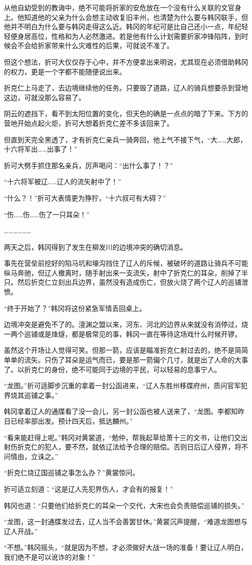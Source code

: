 从他自幼受到的教诲中，绝不可能将折家的安危放在一个没有什么关联的文官身上。他知道他的父亲为什么会想主动收复旧丰州，也清楚为什么要与韩冈联手，但他并不明白为什么要与韩冈走得这么近。韩冈的年纪可是比自己还小一点，年纪轻轻便身居高位，性格和为人必然激进。若是他有什么计划需要折家冲锋陷阵，到时候会不会给折家带来什么灾难性的后果，可就说不准了。

但这个想法，折可大仅仅存于心中，并不方便拿出来明说，尤其现在必须借助韩冈的权力，更是一个字都不能随便说出来。

折克仁上马走了，去边境继续他的任务。只要毁了道路，辽人的骑兵想要杀到营地这边，可就没那么容易了。

阴云的遮挡下，看不到太阳位置的变化，但天色的确是一点点的暗了下来。下方的营地开始点起火炬，折可大想着折克仁差不多该回来了。

但直到天完全黑透了，才有折克仁亲兵一骑奔回，他上气不接下气，“大……大郎，十六将军出……出事了！”

折可大劈手抓住那名亲兵，厉声喝问：“出什么事了！？”

“十六将军被辽……辽人的流矢射中了！”

“什么？！”折可大表情更为狰狞，“十六叔可有大碍？”

“伤……伤……伤了一只耳朵！”

………………

两天之后，韩冈得到了发生在柳发川的边境冲突的确切消息。

事先在营垒前挖好的陷马坑和壕沟挡住了辽人的斥候，被破坏的道路让骑兵不可能纵马奔驰，但辽人撤离时，随手射出来一支流矢，射中了折克仁的耳朵，削掉了半只。然后折克仁立刻出兵边界，虽然没有造成伤亡，但放火烧了两个辽人的巡铺泄愤。

“终于开始了？”韩冈将这份紧急军情丢回桌上。

边境冲突是避免不了的。澶渊之盟以来，河东、河北的边界从来就没有消停过，烧一两个巡铺或是烽燧，都是极常见的事，韩冈一直在等待这场戏什么时候开锣。

虽然这个开场让人觉得可笑。但那一箭，应该是瞄准折克仁射过去的，绝不是简简单单的流矢。只伤了耳朵是运气而已，要是那一箭偏个几寸，就是出了人命的大事了。以折克仁的身份，绝不可能同于边境的平民，可以轻易的息事宁人。

“龙图。”折可适脚步沉重的拿着一封公函进来，“辽人东胜州移牒府州，质问官军犯界烧其巡铺之事。”

韩冈拿着辽人的通牒看了没一会儿，另一封公函也被人送来了，“龙图。李都知昨日已经率部出发。预计四天后，抵达麟州。”

“看来能赶得上呢。”韩冈对黄裳道，“勉仲，帮我起草给萧十三的文书，让他们交出射伤折克仁的犯人，要不然，就依辽法给予合理的赔偿。否则日后辽人侵界，将不问情由，立诛之。”

“折克仁烧辽国巡铺之事怎么办？”黄裳惊问。

折可适立刻道：“这是辽人先犯界伤人，才会有的报复！”

韩冈也道：“只要他们给折克仁的耳朵一个交代，大宋也会负责赔偿巡铺的损失。”

“龙图，这一封通牒发过去，辽人当不会善罢甘休。”黄裳沉声提醒，“难道龙图想与辽人开战。”

“不想。”韩冈摇头，“就是因为不想，才必须做好大战一场的准备！要让辽人明白，我们绝不是可以讹诈的对象！”

